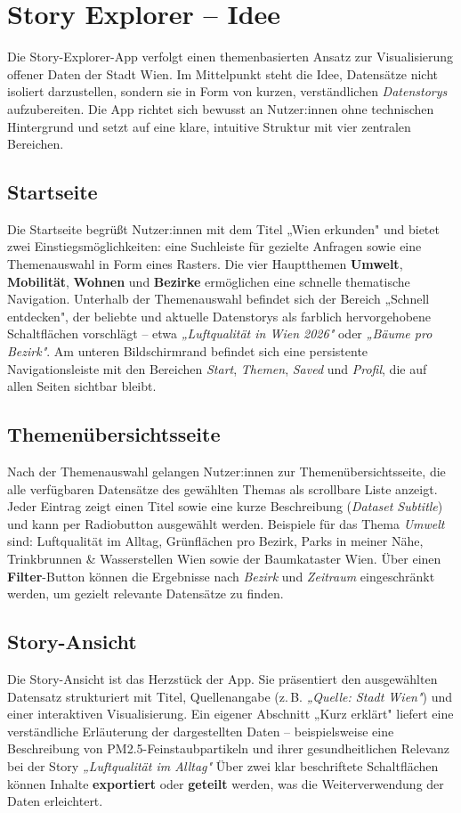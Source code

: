 \section{Story Explorer – Idee}
\noindent
Die Story-Explorer-App verfolgt einen themenbasierten Ansatz zur Visualisierung offener Daten der Stadt Wien.
Im Mittelpunkt steht die Idee, Datensätze nicht isoliert darzustellen, sondern sie in Form von kurzen, verständlichen \textit{Datenstorys} aufzubereiten.
Die App richtet sich bewusst an Nutzer:innen ohne technischen Hintergrund und setzt auf eine klare, intuitive Struktur mit vier zentralen Bereichen.
%
\subsection{Startseite}
%
\noindent
Die Startseite begrüßt Nutzer:innen mit dem Titel „Wien erkunden" und bietet zwei Einstiegsmöglichkeiten: eine Suchleiste für gezielte Anfragen sowie eine Themenauswahl in Form eines Rasters.
Die vier Hauptthemen \textbf{Umwelt}, \textbf{Mobilität}, \textbf{Wohnen} und \textbf{Bezirke} ermöglichen eine schnelle thematische Navigation.
Unterhalb der Themenauswahl befindet sich der Bereich „Schnell entdecken", der beliebte und aktuelle Datenstorys als farblich hervorgehobene Schaltflächen vorschlägt – etwa \textit{„Luftqualität in Wien 2026"} oder \textit{„Bäume pro Bezirk"}.
Am unteren Bildschirmrand befindet sich eine persistente Navigationsleiste mit den Bereichen \textit{Start}, \textit{Themen}, \textit{Saved} und \textit{Profil}, die auf allen Seiten sichtbar bleibt.
%
\subsection{Themenübersichtsseite}
%
\noindent
Nach der Themenauswahl gelangen Nutzer:innen zur Themenübersichtsseite, die alle verfügbaren Datensätze des gewählten Themas als scrollbare Liste anzeigt.
Jeder Eintrag zeigt einen Titel sowie eine kurze Beschreibung (\textit{Dataset Subtitle}) und kann per Radiobutton ausgewählt werden.
Beispiele für das Thema \textit{Umwelt} sind: Luftqualität im Alltag, Grünflächen pro Bezirk, Parks in meiner Nähe, Trinkbrunnen \& Wasserstellen Wien sowie der Baumkataster Wien.
Über einen \textbf{Filter}-Button können die Ergebnisse nach \textit{Bezirk} und \textit{Zeitraum} eingeschränkt werden, um gezielt relevante Datensätze zu finden.
%
\subsection{Story-Ansicht}
%
\noindent
Die Story-Ansicht ist das Herzstück der App. Sie präsentiert den ausgewählten Datensatz strukturiert mit Titel, Quellenangabe (z.\,B. \textit{„Quelle: Stadt Wien"}) und einer interaktiven Visualisierung.
Ein eigener Abschnitt „Kurz erklärt" liefert eine verständliche Erläuterung der dargestellten Daten – beispielsweise eine Beschreibung von PM2.5-Feinstaubpartikeln und ihrer gesundheitlichen Relevanz bei der Story \textit{„Luftqualität im Alltag"}
Über zwei klar beschriftete Schaltflächen können Inhalte \textbf{exportiert} oder \textbf{geteilt} werden, was die Weiterverwendung der Daten erleichtert.
%
